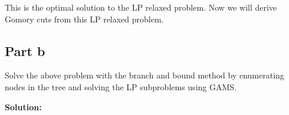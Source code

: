 \documentclass[11pt]{article}
\begin{document}
This is the optimal solution to the LP relaxed problem.
Now we will derive Gomory cuts from this LP relaxed problem.


\subsection{Part b}
Solve the above problem with the branch and bound method by enumerating nodes in the tree and solving the LP subproblems using GAMS.

\textbf{Solution: }
\end{document}
